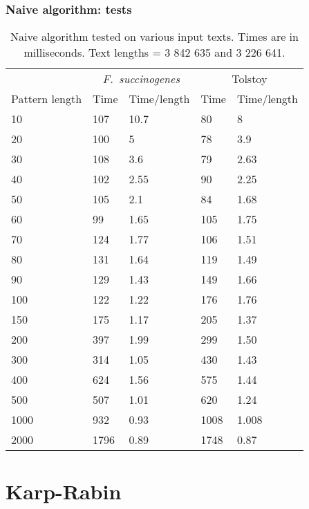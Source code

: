 \documentclass{beamer}
\begin{document}
\begin{frame}
  \frametitle{Naive algorithm: tests}
  
  \begin{table}[ht]
    \centering
    \tiny
  \begin{tabular}{lllll}
    \toprule[1pt]
    & \multicolumn{2}{c}{\emph{F.\ succinogenes}} & \multicolumn{2}{c}{Tolstoy} \\
    Pattern length & Time & Time/length & Time & Time/length \\
    \cmidrule(r){1-1} \cmidrule(lr){2-3} \cmidrule(lr){4-5}
    10 & 107 & 10.7 & 80 & 8 \\
    20 & 100 & 5 & 78 & 3.9 \\
    30 & 108 & 3.6 & 79 & 2.63 \\
    40 & 102 & 2.55 & 90 & 2.25 \\
    50 & 105 & 2.1 & 84 & 1.68 \\
    60 & 99 & 1.65 & 105 & 1.75 \\
    70 & 124 & 1.77 & 106 & 1.51 \\
    80 & 131 & 1.64 & 119 & 1.49 \\
    90 & 129 & 1.43 & 149 & 1.66 \\
    100 & 122 & 1.22 & 176 & 1.76 \\
    150 & 175 & 1.17 & 205 & 1.37 \\
    200 & 397 & 1.99 & 299 & 1.50 \\
    300 & 314 & 1.05 & 430 & 1.43 \\
    400 & 624 & 1.56 & 575 & 1.44 \\
    500 & 507 & 1.01 & 620 & 1.24 \\
    1000 & 932 & 0.93 & 1008 & 1.008 \\
    2000 & 1796 & 0.89 & 1748 & 0.87 \\
    \bottomrule[1pt]
  \end{tabular}
  \caption{\small Naive algorithm tested on various input texts. Times are in milliseconds. Text lengths = 3 842 635 and 3 226 641.}
\end{table}
\end{frame}

\section{Karp-Rabin}
\label{sec:karp-rabin}
\end{document}
